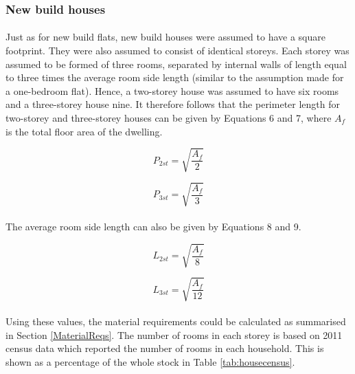 \documentclass[12pt]{article}
\begin{document}
\subsubsection{New build houses}
\label{newbuildhouse}

\paragraph{}
Just as for new build flats, new build houses were assumed to have a square footprint. They were also assumed to consist of identical storeys. Each storey was assumed to be formed of three rooms, separated by internal walls of length equal to three times the average room side length (similar to the assumption made for a one-bedroom flat). Hence, a two-storey house was assumed to have six rooms and a three-storey house nine. It therefore follows that the perimeter length for two-storey and three-storey houses can be given by Equations 6 and 7, where $A_f$ is the total floor area of the dwelling.

\begin{equation}
    P_{2st} = \sqrt{\frac{A_f}{2}}
\end{equation}

\begin{equation}
    P_{3st} = \sqrt{\frac{A_f}{3}}
\end{equation}

\paragraph{}
The average room side length can also be given by Equations 8 and 9. 

\begin{equation}
    L_{2st} = \sqrt{\frac{A_f}{8}}
\end{equation}

\begin{equation}
    L_{3st} = \sqrt{\frac{A_f}{12}}
\end{equation}

\paragraph{}
Using these values, the material requirements could be calculated as summarised in Section \ref{MaterialReqs}. The number of rooms in each storey is based on 2011 census data \citep{Office_for_National_Statistics2011-wb} which reported the number of rooms in each household. This is shown as a percentage of the whole stock in Table \ref{tab:housecensus}. 
\end{document}
